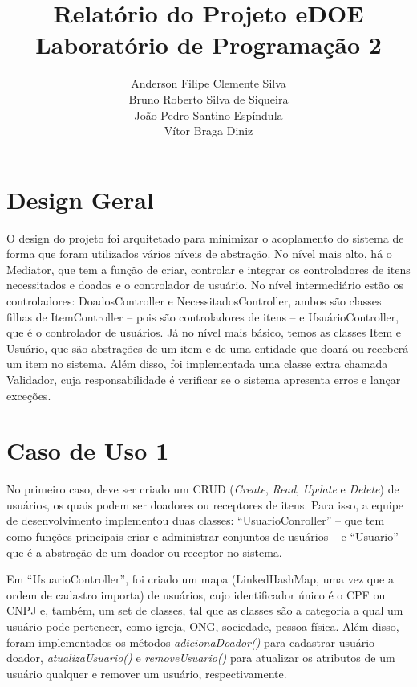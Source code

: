 \documentclass[journal,12pt,onecolumn,draftclsnofoot,]{article}
\begin{document}
	
	\title{Relatório do Projeto eDOE \\ Laboratório de Programação 2}
	\author{Anderson Filipe Clemente Silva \\
			Bruno Roberto Silva de Siqueira \\
			João Pedro Santino Espíndula \\
			Vítor Braga Diniz}
	
	\maketitle
	\newpage
	
	\tableofcontents
	
	\newpage
	
	\section{Design Geral}
	O design do projeto foi arquitetado para minimizar o acoplamento do sistema de forma que foram utilizados vários níveis de abstração. No nível mais alto, há o Mediator, que tem a função de criar, controlar e integrar os controladores de itens necessitados e doados e o controlador de usuário. No nível intermediário estão os controladores: DoadosController e NecessitadosController, ambos são classes filhas de ItemController -- pois são controladores de itens -- e UsuárioController, que é o controlador de usuários. Já no nível mais básico, temos as classes Item e Usuário, que são abstrações de um item e de uma entidade que doará ou receberá um item no sistema. Além disso, foi implementada uma classe extra chamada Validador, cuja responsabilidade é verificar se o sistema apresenta erros e lançar exceções. 
	
	\section{Caso de Uso 1}
	No primeiro caso, deve ser criado um CRUD (\textit{Create}, \textit{Read}, \textit{Update} e \textit{Delete}) de usuários, os quais podem ser doadores ou receptores de itens. Para isso, a equipe de desenvolvimento implementou duas classes: “UsuarioConroller” -- que tem como funções principais criar e administrar conjuntos de usuários -- e “Usuario” -- que é a abstração de um doador ou receptor no sistema.
	
	Em “UsuarioController”,  foi criado um mapa (LinkedHashMap, uma vez que a ordem de cadastro importa) de usuários, cujo identificador único é o CPF ou CNPJ e, também, um set de classes, tal que as classes são a categoria a qual um usuário pode pertencer, como igreja, ONG, sociedade, pessoa física. Além disso, foram implementados os métodos \textit{adicionaDoador()} para cadastrar usuário doador, \textit{atualizaUsuario()} e \textit{removeUsuario()} para atualizar os atributos de um usuário qualquer e remover um usuário, respectivamente.
	
\end{document}
